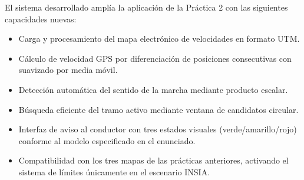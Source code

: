 \documentclass[10pt]{article}
\begin{document}
El sistema desarrollado amplía la aplicación de la Práctica 2 con las siguientes capacidades nuevas:

\begin{itemize}[leftmargin=1.2em]
    \item Carga y procesamiento del mapa electrónico de velocidades en formato UTM.
    \item Cálculo de velocidad GPS por diferenciación de posiciones consecutivas con suavizado por media móvil.
    \item Detección automática del sentido de la marcha mediante producto escalar.
    \item Búsqueda eficiente del tramo activo mediante ventana de candidatos circular.
    \item Interfaz de aviso al conductor con tres estados visuales (verde/amarillo/rojo) conforme al modelo especificado en el enunciado.
    \item Compatibilidad con los tres mapas de las prácticas anteriores, activando el sistema de límites únicamente en el escenario INSIA.
\end{itemize}
\end{document}
